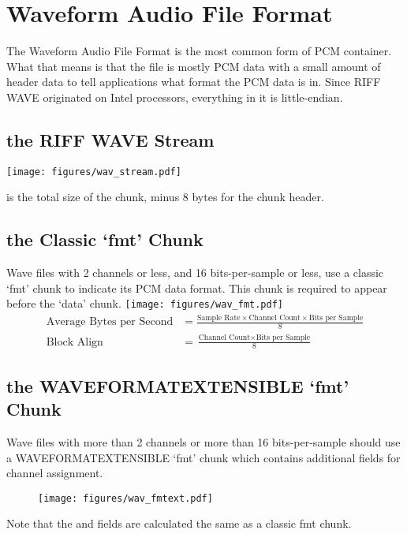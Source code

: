 
\chapter{Waveform Audio File Format}
The Waveform Audio File Format is the most common form of PCM container.
What that means is that the file is mostly PCM data with a
small amount of header data to tell applications what format the
PCM data is in.
Since RIFF WAVE originated on Intel processors, everything in it
is little-endian.
\section{the RIFF WAVE Stream}
\texttt{[image: figures/wav\_stream.pdf]}
\par
\noindent
{} is the total size of the chunk, minus
8 bytes for the chunk header.
\section{the Classic `fmt' Chunk}
Wave files with 2 channels or less, and 16 bits-per-sample or less,
use a classic `fmt' chunk to indicate its PCM data format.
This chunk is required to appear before the `data' chunk.
\texttt{[image: figures/wav\_fmt.pdf]}
\begin{align}
\text{Average Bytes per Second} &= \frac{\text{Sample Rate}
  \times \text{Channel Count} \times \text{Bits per Sample}}{8} \\
\text{Block Align} &= \frac{\text{Channel Count} \times \text{Bits per Sample}}{8}
\end{align}
\section{the WAVEFORMATEXTENSIBLE `fmt' Chunk}
Wave files with more than 2 channels or more than 16 bits-per-sample
should use a WAVEFORMATEXTENSIBLE `fmt' chunk which contains
additional fields for channel assignment.
\begin{figure}[h]
\texttt{[image: figures/wav\_fmtext.pdf]}
\end{figure}
\par
\noindent
Note that the  and  fields
are calculated the same as a classic fmt chunk.

